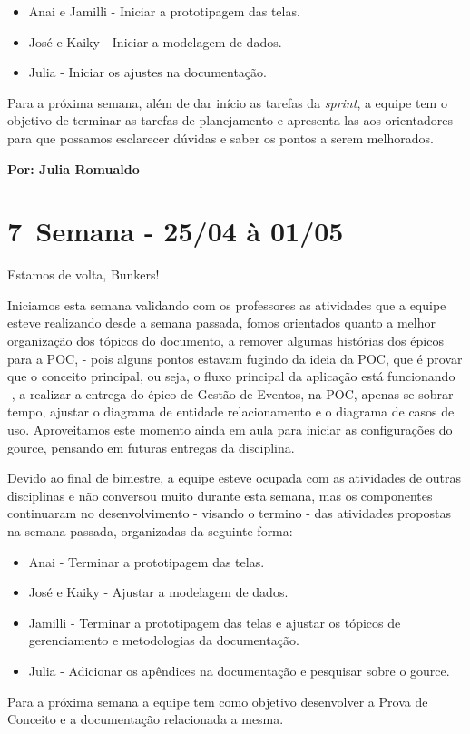 \begin{itemize}
    \item Anai e Jamilli - Iniciar a prototipagem das telas.
    \item José e Kaiky - Iniciar a modelagem de dados.
    \item Julia - Iniciar os ajustes na documentação.
\end{itemize}

Para a próxima semana, além de dar início as tarefas da \textsl{sprint}, a equipe tem o objetivo de terminar as tarefas de planejamento e apresenta-las aos orientadores para que possamos esclarecer dúvidas e saber os pontos a serem melhorados.

\textbf{Por: Julia Romualdo}

\section{7\textordfeminine \, Semana - 25/04 à 01/05}
Estamos de volta, Bunkers!

Iniciamos esta semana validando com os professores as atividades que a equipe esteve realizando desde a semana passada, fomos orientados quanto a melhor organização dos tópicos do documento, a remover algumas histórias dos épicos para a \acs{POC}, - pois alguns pontos estavam fugindo da ideia da \acs{POC}, que é provar que o conceito principal, ou seja, o fluxo principal da aplicação está funcionando -, a realizar a entrega do épico de Gestão de Eventos, na \acs{POC}, apenas se sobrar tempo, ajustar o diagrama de entidade relacionamento e o diagrama de casos de uso. Aproveitamos este momento ainda em aula para iniciar as configurações do \gls{gource}, pensando em futuras entregas da disciplina.

Devido ao final de bimestre, a equipe esteve ocupada com as atividades de outras disciplinas e não conversou muito durante esta semana, mas os componentes continuaram no desenvolvimento - visando o termino - das atividades propostas na semana passada, organizadas da seguinte forma:
\begin{itemize}
    \item Anai - Terminar a prototipagem das telas.
    \item José e Kaiky - Ajustar a modelagem de dados.
    \item Jamilli - Terminar a prototipagem das telas e ajustar os tópicos de gerenciamento e metodologias da documentação. 
    \item Julia - Adicionar os apêndices na documentação e pesquisar sobre o \gls{gource}.
\end{itemize}
\noindent Para a próxima semana a equipe tem como objetivo desenvolver a Prova de Conceito e a documentação relacionada a mesma.

